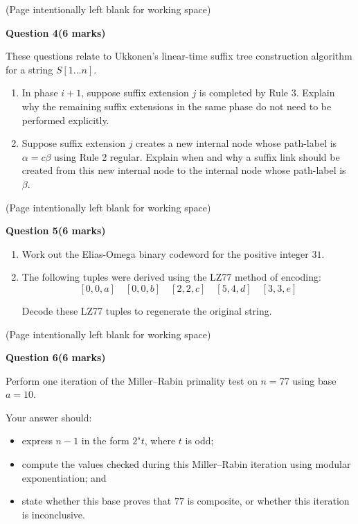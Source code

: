 \documentclass[12pt,letterpaper]{article}
\newcommand{\marksbox}[1]{%
  \vfill
  \begin{flushright}
    \fbox{\parbox[c][1.1cm][c]{1.3cm}{\centering #1}}
  \end{flushright}
}
\newcommand{\questiontitle}[2]{%
  \textbf{Question #1}\hfill\textbf{(#2 marks)}
}
\newcommand{\workingpage}{%
  \newpage
  \begin{center}
    (Page intentionally left blank for working space)
  \end{center}
}
\begin{document}
\marksbox{6}

\workingpage
\newpage

\questiontitle{4}{6}

These questions relate to Ukkonen's linear-time suffix tree construction
algorithm for a string $S[1 \ldots n]$.

\begin{enumerate}
  \item[(i)] In phase $i+1$, suppose suffix extension $j$ is completed by Rule 3.
  Explain why the remaining suffix extensions in the same phase do not need to
  be performed explicitly.

  \item[(ii)] Suppose suffix extension $j$ creates a new internal node whose
  path-label is $\alpha = c\beta$ using Rule 2 regular. Explain when and why a
  suffix link should be created from this new internal node to the internal node
  whose path-label is $\beta$.
\end{enumerate}

\marksbox{6}

\workingpage
\newpage

\questiontitle{5}{6}

\begin{enumerate}
  \item[(i)] Work out the Elias-Omega binary codeword for the positive integer
  $31$.

  \item[(ii)] The following tuples were derived using the LZ77 method of
  encoding:
  \[
    [0,0,a]\quad
    [0,0,b]\quad
    [2,2,c]\quad
    [5,4,d]\quad
    [3,3,e]
  \]

  Decode these LZ77 tuples to regenerate the original string.
\end{enumerate}

\marksbox{6}

\workingpage
\newpage

\questiontitle{6}{6}

Perform one iteration of the Miller--Rabin primality test on $n = 77$ using
base $a = 10$.

Your answer should:
\begin{itemize}
  \item express $n-1$ in the form $2^s t$, where $t$ is odd;
  \item compute the values checked during this Miller--Rabin iteration using
  modular exponentiation; and
  \item state whether this base proves that $77$ is composite, or whether this
  iteration is inconclusive.
\end{itemize}
\end{document}
